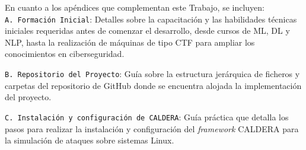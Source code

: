 En cuanto a los apéndices que complementan este Trabajo, se incluyen: \\

\texttt{A. Formación Inicial}: Detalles sobre la capacitación y las habilidades técnicas iniciales requeridas antes de comenzar el desarrollo, desde cursos de \gls{ML}, \gls{DL} y \gls{NLP}, hasta la realización de máquinas de tipo \gls{CTF} para ampliar los conocimientos en ciberseguridad.

\texttt{B. Repositorio del Proyecto}: Guía sobre la estructura jerárquica de ficheros y carpetas del repositorio de GitHub donde se encuentra alojada la implementación del proyecto.

\texttt{C. Instalación y configuración de \gls{CALDERA}}: Guía práctica que detalla los pasos para realizar la instalación y configuración del \textit{framework} \gls{CALDERA} para la simulación de ataques sobre sistemas Linux.
